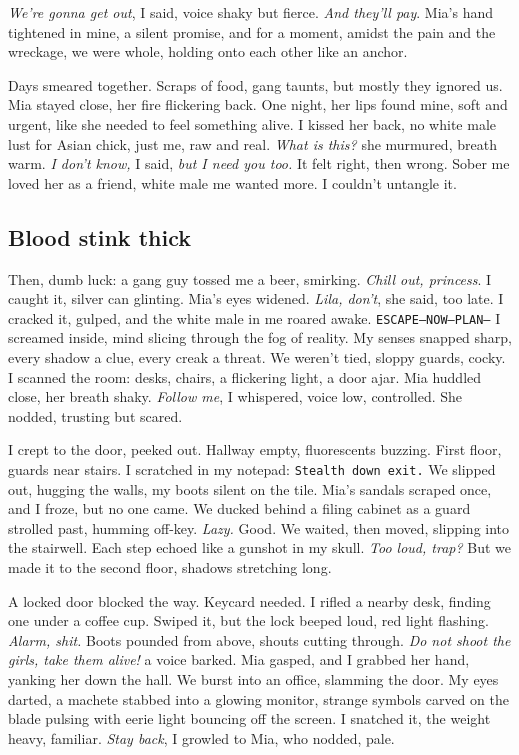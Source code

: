 \documentclass[12pt,oneside]{book} %
\newcommand{\note}[1]{\texttt{#1}}
\begin{document}
\textit{We’re gonna get out}, I said, voice shaky but fierce. \textit{And they’ll pay}. Mia’s hand tightened in mine, a silent promise, and for a moment, amidst the pain and the wreckage, we were whole, holding onto each other like an anchor.

Days smeared together. Scraps of food, gang taunts, but mostly they ignored us. Mia stayed close, her fire flickering back. One night, her lips found mine, soft and urgent, like she needed to feel something alive. I kissed her back, no white male lust for Asian chick, just me, raw and real. \textit{What is this?} she murmured, breath warm. \textit{I don’t know,} I said, \textit{but I need you too.} It felt right, then wrong. Sober me loved her as a friend, white male me wanted more. I couldn’t untangle it.

\subsection*{Blood stink thick}

Then, dumb luck: a gang guy tossed me a beer, smirking. \textit{Chill out, princess}. I caught it, silver can glinting. Mia’s eyes widened. \textit{Lila, don’t}, she said, too late. I cracked it, gulped, and the white male in me roared awake. \note{ESCAPE—NOW—PLAN—} I screamed inside, mind slicing through the fog of reality. My senses snapped sharp, every shadow a clue, every creak a threat. We weren’t tied, sloppy guards, cocky. I scanned the room: desks, chairs, a flickering light, a door ajar. Mia huddled close, her breath shaky. \textit{Follow me}, I whispered, voice low, controlled. She nodded, trusting but scared.

I crept to the door, peeked out. Hallway empty, fluorescents buzzing. First floor, guards near stairs. I scratched in my notepad: \note{Stealth down exit.} We slipped out, hugging the walls, my boots silent on the tile. Mia’s sandals scraped once, and I froze, but no one came. We ducked behind a filing cabinet as a guard strolled past, humming off-key. \textit{Lazy.} Good. We waited, then moved, slipping into the stairwell. Each step echoed like a gunshot in my skull. \textit{Too loud, trap?} But we made it to the second floor, shadows stretching long.

A locked door blocked the way. Keycard needed. I rifled a nearby desk, finding one under a coffee cup. Swiped it, but the lock beeped loud, red light flashing. \textit{Alarm, shit.} Boots pounded from above, shouts cutting through. \textit{Do not shoot the girls, take them alive!} a voice barked. Mia gasped, and I grabbed her hand, yanking her down the hall. We burst into an office, slamming the door. My eyes darted, a machete stabbed into a glowing monitor, strange symbols carved on the blade pulsing with eerie light bouncing off the screen. I snatched it, the weight heavy, familiar. \textit{Stay back}, I growled to Mia, who nodded, pale.
\end{document}
